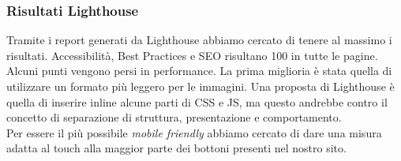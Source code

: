 \subsubsection{Risultati Lighthouse}
Tramite i report generati da Lighthouse abbiamo cercato di tenere al massimo i risultati. Accessibilità, Best Practices e SEO risultano 100 in tutte le pagine.\\
Alcuni punti vengono persi in performance. La prima miglioria è stata quella di utilizzare un formato più leggero per le immagini. Una proposta di Lighthouse è quella di inserire inline alcune parti di CSS e JS, ma questo andrebbe contro il concetto di separazione di struttura, presentazione e comportamento.\\
Per essere il più possibile \textit{mobile friendly} abbiamo cercato di dare una misura adatta al touch alla maggior parte dei bottoni presenti nel nostro sito.

